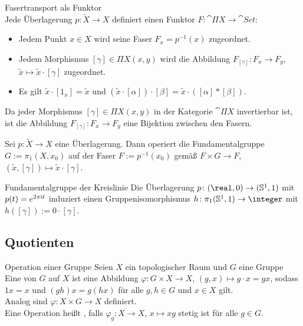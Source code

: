 \begin{Satz}{Fasertransport als Funktor}\\
    Jede Überlagerung $p\colon \widetilde{X} \rightarrow X$ definiert einen
    Funktor $F\colon \cat{\Pi X} \rightarrow \cat{Set}$:
    \begin{itemize}
        \item
        Jedem Punkt $x \in X$ wird seine Faser $F_x = p^{-1}(x)$ zugeordnet.

        \item
        Jedem Morphismus $[\gamma] \in \Pi X(x, y)$ wird die Abbildung
        $F_{[\gamma]}\colon F_x \rightarrow F_y$,
        $\widetilde{x} \mapsto \widetilde{x} \cdot [\gamma]$ zugeordnet.

        \item
        Es gilt $\widetilde{x} \cdot [1_x] = \widetilde{x}$ und
        $(\widetilde{x} \cdot [\alpha]) \cdot [\beta] =
        \widetilde{x} \cdot ([\alpha] \ast [\beta])$.
    \end{itemize}
    Da jeder Morphismus $[\gamma] \in \Pi X(x, y)$ in der Kategorie
    $\cat{\Pi X}$ invertierbar ist, ist die Abbildung
    $F_{[\gamma]}\colon F_x \rightarrow F_y$
    eine Bijektion zwischen den Fasern.
\end{Satz}

\begin{Kor}
    Sei $p\colon \widetilde{X} \rightarrow X$ eine Überlagerung.
    Dann operiert die Fundamentalgruppe \\
    $G := \pi_1(X, x_0)$ auf der
    Faser $F := p^{-1}(x_0)$ gemäß $F \times G \rightarrow F$,
    $(\widetilde{x}, [\gamma]) \mapsto \widetilde{x} \cdot [\gamma]$.
\end{Kor}

\linie

\begin{Satz}{Fundamentalgruppe der Kreislinie}
    Die Überlagerung $p\colon (\real, 0) \rightarrow (\sphere^1, 1)$ mit
    $p(t) = e^{2\pi\mathrm{i} t}$ induziert einen Gruppenisomorphismus
    $h\colon \pi_1(\sphere^1, 1) \rightarrow \integer$ mit
    $h([\gamma]) := 0 \cdot [\gamma]$.
\end{Satz}

\pagebreak

\subsection{%
    Quotienten%
}

\begin{Def}{Operation einer Gruppe}
    Seien $X$ ein topologischer Raum und $G$ eine Gruppe
    Eine  von $G$ auf $X$ ist eine Abbildung
    $\varphi\colon G \times X \rightarrow X$, $(g, x) \mapsto g \cdot x = gx$,
    sodass $1x = x$ und $(gh)x = g(hx)$ für alle $g, h \in G$ und $x \in X$
    gilt. \\
    Analog sind 
    $\varphi\colon X \times G \rightarrow X$ definiert. \\
    Eine Operation heißt , falls
    $\varphi_g\colon X \rightarrow X$, $x \mapsto xg$ stetig ist
    für alle $g \in G$.
\end{Def}

